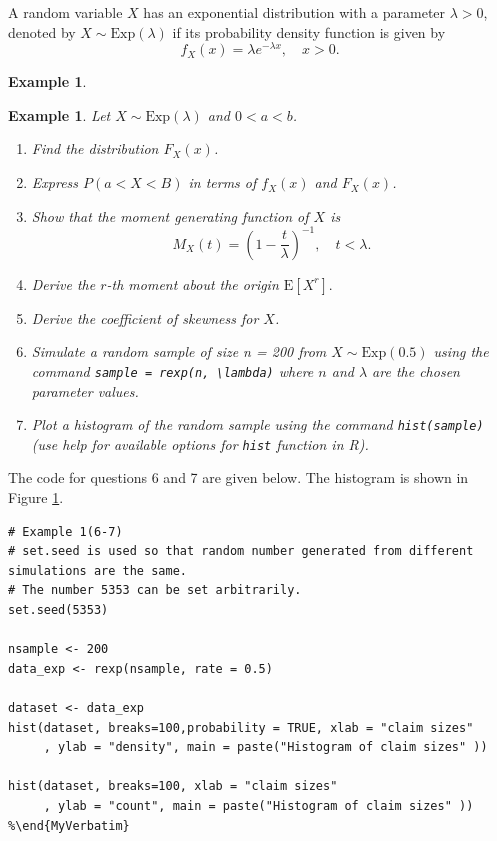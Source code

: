 \documentclass[
]{book}
\theoremstyle{definition}
\theoremstyle{definition}
\newtheorem{example}{Example}[chapter]
\theoremstyle{definition}
\theoremstyle{definition}
\theoremstyle{remark}
\begin{document}
A random variable \(X\) has an exponential distribution with a parameter
\(\lambda > 0\), denoted by \(X \sim \text{Exp}(\lambda)\) if its
probability density function is given by
\[f_X(x) = \lambda e^{-\lambda x}, \quad x > 0.\]

\begin{example}
\protect\hypertarget{exm:unlabeled-div-28}{}\label{exm:unlabeled-div-28}

\textbf{Example 1}. \emph{Let \(X \sim \text{Exp}(\lambda)\) and \(0 < a < b\).}

\begin{enumerate}
\def\labelenumi{\arabic{enumi}.}
\item
  \emph{Find the distribution \(F_X(x)\).}
\item
  \emph{Express \(P(a < X < B)\) in terms of \(f_X(x)\) and \(F_X(x)\).}
\item
  \emph{Show that the moment generating function of \(X\) is
  \[M_X(t) = \left(1 -  \frac{t}{\lambda}\right)^{-1}, \quad t < \lambda.\]}
\item
  \emph{Derive the \(r\)-th moment about the origin \(\mathrm{E}[X^r].\)}
\item
  \emph{Derive the coefficient of skewness for \(X\).}
\item
  \emph{Simulate a random sample of size n = 200 from
  \(X \sim \text{Exp}(0.5)\) using the command
  \texttt{sample\ =\ rexp(n,\ \textbackslash{}lambda)} where \(n\) and \(\lambda\) are the chosen
  parameter values.}
\item
  \emph{Plot a histogram of the random sample using the command
  \texttt{hist(sample)} (use help for available options for \texttt{hist} function
  in R).}
\end{enumerate}

\end{example}

The code for questions 6 and 7 are given below. The histogram is shown
in Figure \protect\hyperlink{FigHistogramExp}{1}.

\begin{verbatim}
# Example 1(6-7)
# set.seed is used so that random number generated from different simulations are the same. 
# The number 5353 can be set arbitrarily. 
set.seed(5353)

nsample <- 200
data_exp <- rexp(nsample, rate = 0.5)

dataset <- data_exp
hist(dataset, breaks=100,probability = TRUE, xlab = "claim sizes" 
     , ylab = "density", main = paste("Histogram of claim sizes" ))

hist(dataset, breaks=100, xlab = "claim sizes" 
     , ylab = "count", main = paste("Histogram of claim sizes" ))
%\end{MyVerbatim}
\end{verbatim}
\end{document}
